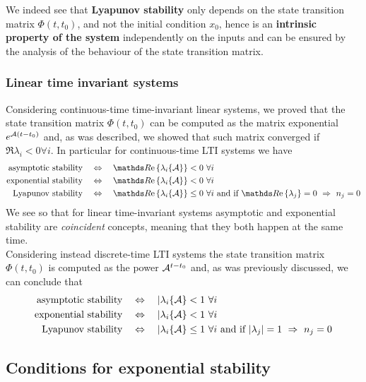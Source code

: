 	We indeed see that \textbf{Lyapunov stability} only depends on the state transition matrix $\Phi(t,t_0)$, and not the initial condition $x_0$, hence is an \textbf{intrinsic property of the system} independently on the inputs and can be ensured by the analysis of the behaviour of the state transition matrix.
	
	\subsubsection{Linear time invariant systems}
		Considering continuous-time time-invariant linear systems, we proved that the state transition matrix $\Phi(t,t_0)$ can be computed as the matrix exponential $e^{\mathcal{A}(t-t_0)}$ and, as was described, we showed that such matrix converged if $\Re{\lambda_i} < 0 \forall i$. In particular for continuous-time LTI systems we have 
		\begin{align*}
			\textrm{asymptotic stability} \quad & \Leftrightarrow \quad \Re{ \lambda_i\{\A\} } < 0 \ \forall i \\
			\textrm{exponential stability} \quad & \Leftrightarrow \quad \Re{ \lambda_i\{\A\} } < 0 \ \forall i \\
			\textrm{Lyapunov stability} \quad & \Leftrightarrow \quad \Re{ \lambda_i\{\A\} } \leq 0 \ \forall i \textrm{ and if } \Re{\lambda_j} = 0 \ \Rightarrow \ n_j = 0
		\end{align*} 
		We see so that for linear time-invariant systems asymptotic and exponential stability are \textit{coincident} concepts, meaning that they both happen at the same time.\\
		Considering instead discrete-time LTI systems the state transition matrix $\Phi(t,t_0)$ is computed as the power $\mathcal{A}^{t-t_0}$ and, as was previously discussed, we can conclude that
		\begin{align*}
			\textrm{asymptotic stability} \quad & \Leftrightarrow \quad |\lambda_i\{\mathcal{A}\} < 1 \ \forall i \\
			\textrm{exponential stability} \quad & \Leftrightarrow \quad |\lambda_i\{\mathcal{A}\} < 1 \ \forall i \\
			\textrm{Lyapunov stability} \quad & \Leftrightarrow \quad |\lambda_i\{\mathcal{A}\} \leq 1 \ \forall i \textrm{ and if } |\lambda_j| = 1 \ \Rightarrow \ n_j = 0
		\end{align*} 
	
	\subsection{Conditions for exponential stability}
